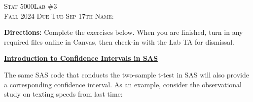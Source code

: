 \documentclass[11pt]{article}
\begin{document}
\large \noindent \textsc{Stat 5000}\hfill \large{\textsc{Lab \#3}} \hfill {} \\
\large \textsc{Fall 2024}  \hfill \textsc{Due Tue Sep 17th} \hfill \textsc{Name:} \underline{\hspace{2in}} \\

\vspace{14pt}

\noindent \textbf{Directions:} Complete the exercises below. When you are finished, turn in any required files online in Canvas, then check-in with the Lab TA for dismissal.
\\ \underline{\hspace{7in}}
\vspace{14pt}


\textbf{\underline{Introduction to Confidence Intervals in SAS}}

The same SAS code that conducts the two-sample t-test in SAS will also provide a corresponding confidence interval. As an example, consider the observational study on texting speeds from last time:
\end{document}
